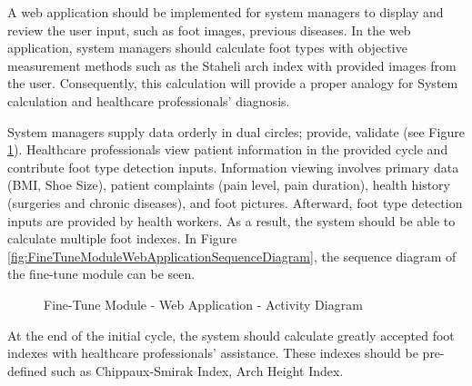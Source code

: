 A web application should be implemented for system managers to display and review the user input, such as foot images, previous diseases. In the web application, system managers should calculate foot types with objective measurement methods such as the Staheli arch index with provided images from the user. Consequently, this calculation will provide a proper analogy for System calculation and healthcare professionals' diagnosis. 


System managers supply data orderly in dual circles; provide, validate (see Figure \ref{fig:FineTuneModuleWebApplicationActivityDiagram}). Healthcare professionals view patient information in the provided cycle and contribute foot type detection inputs. Information viewing involves primary data (BMI, Shoe Size),  patient complaints (pain level, pain duration), health history (surgeries and chronic diseases), and foot pictures. Afterward, foot type detection inputs are provided by health workers. As a result, the system should be able to calculate multiple foot indexes. In Figure \ref{fig:FineTuneModuleWebApplicationSequenceDiagram}, the sequence diagram of the fine-tune module can be seen.

\begin{figure}[htbp]
\centering
{}
\caption{Fine-Tune Module - Web Application - Activity Diagram}
\label{fig:FineTuneModuleWebApplicationActivityDiagram}
\end{figure}

At the end of the initial cycle, the system should calculate greatly accepted foot indexes with healthcare professionals' assistance. These indexes should be pre-defined such as Chippaux-Smirak Index, Arch Height Index.

